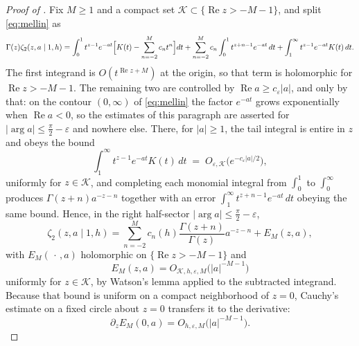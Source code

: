 \documentclass[11pt,letterpaper]{article}
\newcommand{\Zt}{\zeta_2}
\DeclareMathOperator{\Real}{Re}
\begin{document}
\begin{proof}[Proof of ]
Fix $M\ge1$ and a compact set $\mathcal{K}\subset\{\Real z>-M-1\}$, and split
\eqref{eq:mellin} as
\begin{equation*}
  \Gamma(z)\Zt(z,a\mid1,h)
  =\int_0^{1}t^{z-1}e^{-at}\Bigl[K(t)-\sum_{n=-2}^{M}c_nt^{n}\Bigr]dt
   +\sum_{n=-2}^{M}c_n\int_0^{1}t^{z+n-1}e^{-at}\,dt
   +\int_1^{\infty}t^{z-1}e^{-at}K(t)\,dt .
\end{equation*}
The first integrand is $O(t^{\Real z+M})$ at the origin, so that term is
holomorphic for $\Real z>-M-1$. The remaining two are controlled by
$\Real a\ge c_\varepsilon\lvert a\rvert$, and only by that: on the contour
$(0,\infty)$ of \eqref{eq:mellin} the factor $e^{-at}$ grows exponentially when
$\Real a<0$, so the estimates of this paragraph are asserted for
$\lvert\arg a\rvert\le\tfrac{\pi}{2}-\varepsilon$ and nowhere else. There, for
$\lvert a\rvert\ge1$, the tail integral is entire in $z$ and obeys the bound
\begin{equation*}
  \int_1^{\infty}t^{z-1}e^{-at}K(t)\,dt
  \;=\;O_{\varepsilon,\mathcal{K}}\bigl(e^{-c_\varepsilon\lvert a\rvert/2}\bigr),
\end{equation*}
uniformly for $z\in\mathcal{K}$, and completing each monomial integral from
$\int_0^{1}$ to $\int_0^{\infty}$ produces $\Gamma(z+n)a^{-z-n}$ together with
an error $\int_1^{\infty}t^{z+n-1}e^{-at}\,dt$ obeying the same bound. Hence,
in the right half-sector $\lvert\arg a\rvert\le\tfrac{\pi}{2}-\varepsilon$,
\begin{equation}
  \Zt(z,a\mid1,h)=\sum_{n=-2}^{M}c_n(h)\frac{\Gamma(z+n)}{\Gamma(z)}a^{-z-n}
   +E_M(z,a),
  \label{eq:zetaexp}
\end{equation}
with $E_M(\,\cdot\,,a)$ holomorphic on $\{\Real z>-M-1\}$ and
\begin{equation*}
  E_M(z,a)=O_{\mathcal{K},h,\varepsilon,M}\bigl(\lvert a\rvert^{-M-1}\bigr)
\end{equation*}
uniformly for $z\in\mathcal{K}$, by Watson's lemma applied to the subtracted
integrand. Because that bound is uniform on a compact neighborhood of $z=0$,
Cauchy's estimate on a fixed circle about $z=0$ transfers it to the derivative:
\begin{equation}
  \partial_zE_M(0,a)=O_{h,\varepsilon,M}\bigl(\lvert a\rvert^{-M-1}\bigr).
  \label{eq:cauchyrem}
\end{equation}


\end{proof}
\end{document}
